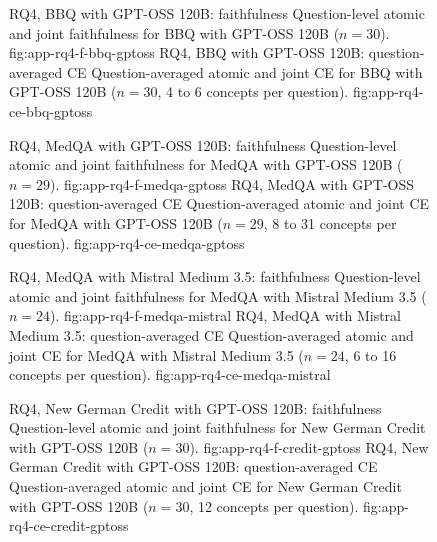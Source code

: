 \begin{figure}[H]
  \centering
    {RQ4, BBQ with GPT-OSS 120B: faithfulness}%
    {Question-level atomic and joint faithfulness for BBQ with GPT-OSS 120B ($n=30$).}%
    {fig:app-rq4-f-bbq-gptoss}%
  \hfill
    {RQ4, BBQ with GPT-OSS 120B: question-averaged CE}%
    {Question-averaged atomic and joint CE for BBQ with GPT-OSS 120B ($n=30$, 4 to 6 concepts per question).}%
    {fig:app-rq4-ce-bbq-gptoss}%
\end{figure}

\begin{figure}[H]
  \centering
    {RQ4, MedQA with GPT-OSS 120B: faithfulness}%
    {Question-level atomic and joint faithfulness for MedQA with GPT-OSS 120B ($n=29$).}%
    {fig:app-rq4-f-medqa-gptoss}%
  \hfill
    {RQ4, MedQA with GPT-OSS 120B: question-averaged CE}%
    {Question-averaged atomic and joint CE for MedQA with GPT-OSS 120B ($n=29$, 8 to 31 concepts per question).}%
    {fig:app-rq4-ce-medqa-gptoss}%
\end{figure}

\begin{figure}[H]
  \centering
    {RQ4, MedQA with Mistral Medium 3.5: faithfulness}%
    {Question-level atomic and joint faithfulness for MedQA with Mistral Medium 3.5 ($n=24$).}%
    {fig:app-rq4-f-medqa-mistral}%
  \hfill
    {RQ4, MedQA with Mistral Medium 3.5: question-averaged CE}%
    {Question-averaged atomic and joint CE for MedQA with Mistral Medium 3.5 ($n=24$, 6 to 16 concepts per question).}%
    {fig:app-rq4-ce-medqa-mistral}%
\end{figure}

\begin{figure}[H]
  \centering
    {RQ4, New German Credit with GPT-OSS 120B: faithfulness}%
    {Question-level atomic and joint faithfulness for New German Credit with GPT-OSS 120B ($n=30$).}%
    {fig:app-rq4-f-credit-gptoss}%
  \hfill
    {RQ4, New German Credit with GPT-OSS 120B: question-averaged CE}%
    {Question-averaged atomic and joint CE for New German Credit with GPT-OSS 120B ($n=30$, 12 concepts per question).}%
    {fig:app-rq4-ce-credit-gptoss}%
\end{figure}

